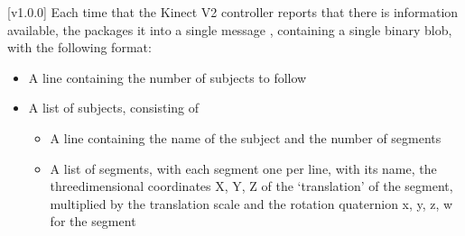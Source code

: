 [v1.0.0]
Each time that the Kinect V2 controller reports that there is information
available, the  packages it into a single message
\openSq{}\closeSq, containing a single binary blob, with the following
format:
\begin{itemize}
\item A line containing the number of subjects to follow
\item\exSp{}A list of subjects, consisting of
\begin{itemize}
\item A line containing the name of the subject and the number of segments
\item\exSp{}A list of segments, with each segment one per line, with its name, the
three\longDash{}dimensional coordinates \openSq{}X, Y, Z\closeSq{} of the `translation'
of the segment, multiplied by the translation scale and the rotation quaternion
\openSq{}x, y, z, w\closeSq{} for the segment
\end{itemize}
\end{itemize}
\appendixEnd{}
